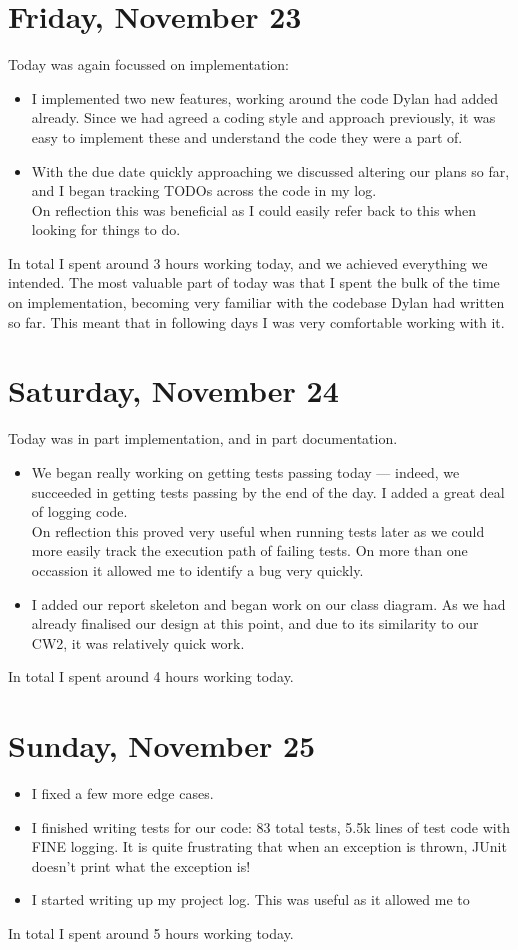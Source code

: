 \documentclass[titlepage, 12pt]{extarticle}
\begin{document}
\section{Friday, November 23}
Today was again focussed on implementation:
\begin{itemize}
\item I implemented two new features, working around the code Dylan had added already. Since we had agreed a coding style and approach previously, it was easy to implement these and understand the code they were a part of. 
\item With the due date quickly approaching we discussed altering our plans so far, and I began tracking TODOs across the code in my log. \\ On reflection this was beneficial as I could easily refer back to this when looking for things to do. 
\end{itemize}
In total I spent around 3 hours working today, and we achieved everything we intended. The most valuable part of today was that I spent the bulk of the time on implementation, becoming very familiar with the codebase Dylan had written so far. This meant that in following days I was very comfortable working with it.

\section{Saturday, November 24}
Today was in part implementation, and in part documentation.

\begin{itemize}
\item We began really working on getting tests passing today --- indeed, we succeeded in getting tests passing by the end of the day. I added a great deal of logging code. \\ On reflection this proved very useful when running tests later as we could more easily track the execution path of failing tests. On more than one occassion it allowed me to identify a bug very quickly. 
\item I added our report skeleton and began work on our class diagram. As we had already finalised our design at this point, and due to its similarity to our CW2, it was relatively quick work.
\end{itemize}

In total I spent around 4 hours working today.

\section{Sunday, November 25}
\begin{itemize}
  \item I fixed a few more edge cases.
  \item I finished writing tests for our code: 83 total tests, 5.5k lines of test code with FINE logging. It is quite frustrating that when an exception is thrown, JUnit doesn't print what the exception is! 
  \item I started writing up my project log. This was useful as it allowed me to 
\end{itemize}
In total I spent around 5 hours working today.
\end{document}
